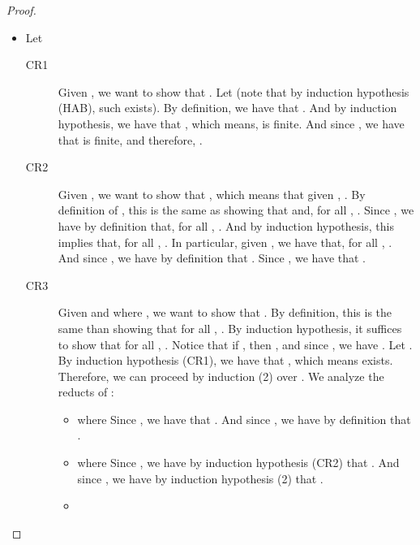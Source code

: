 \documentclass[preprint]{elsarticle}
\begin{document}
\begin{proof}
\begin{itemize}
    \item Let 
    \begin{description}
      \item[CR1]
         Given , we want to show that . Let  (note that by induction hypothesis (HAB), such  exists). By definition, we have that .
        And by induction hypothesis, we have that , which means,  is finite.
        And since , we have that  is finite, and therefore, .
      \item[CR2]
         Given , we want to show that , which means that given , . By definition of , this is the same as showing that  and, for all , .
         Since , we have by definition
        that, for all , . And by induction hypothesis, this implies that, for all , . In
        particular, given , we have that, for all , . And since , we
        have by definition that . Since
        , we have that .
      \item[CR3]
         Given  and  where , we want to show that
        . By definition, this is the same
        than showing that for all , . By induction hypothesis, it suffices to show that for all
        , . Notice
        that if , then , and since
        , we have .
        Let . By induction hypothesis (CR1), we have that , which means  exists. Therefore, we can proceed by induction (2) over .
        We analyze the reducts of :
        \begin{itemize}
          \item  where 
             Since , we have that . And since , we have by definition that .
          \item  where 
             Since , we have by induction hypothesis (CR2) that . And since , we have by induction hypothesis (2) that .
          \item 

\end{itemize}
\end{description}
\end{itemize}
\end{proof}
\end{document}
